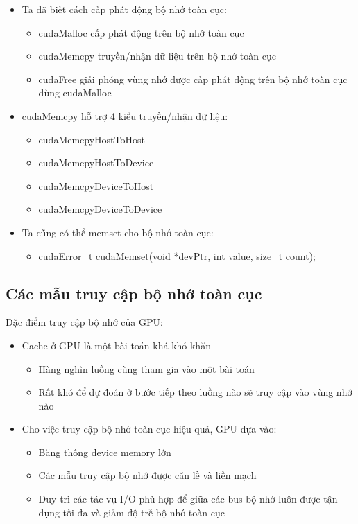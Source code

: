 \documentclass[14pt, a4paper]{article}
\numberwithin{equation}{section}
\numberwithin{figure}{section}
\numberwithin{dl}{section}
\numberwithin{md}{section}
\numberwithin{bd}{section}
\numberwithin{dn}{section}
\numberwithin{hq}{section}
\begin{document}
\begin{itemize}
    \item Ta đã biết cách cấp phát động bộ nhớ toàn cục:
    \begin{itemize}
        \item cudaMalloc cấp phát động trên bộ nhớ toàn cục
        \item cudaMemcpy truyền/nhận dữ liệu trên bộ nhớ toàn cục 
        \item cudaFree giải phóng vùng nhớ được cấp phát động trên bộ nhớ toàn cục dùng cudaMalloc
    \end{itemize}
    \item cudaMemcpy hỗ trợ 4 kiểu truyền/nhận dữ liệu:
    \begin{itemize}
        \item cudaMemcpyHostToHost
        \item cudaMemcpyHostToDevice
        \item cudaMemcpyDeviceToHost
        \item cudaMemcpyDeviceToDevice
    \end{itemize}
    \item Ta cũng có thể memset cho bộ nhớ toàn cục:
    \begin{itemize}
        \item cudaError\_t cudaMemset(void *devPtr, int value, size\_t count);
        
    \end{itemize}
\end{itemize}

\subsection{Các mẫu truy cập bộ nhớ toàn cục}

Đặc điểm truy cập bộ nhớ của GPU:

\begin{itemize}
    \item Cache ở GPU là một bài toán khá khó khăn
    \begin{itemize}
        \item Hàng nghìn luồng cùng tham gia vào một bài toán
        \item Rất khó để dự đoán ở bước tiếp theo luồng nào sẽ truy cập vào vùng nhớ nào 
    \end{itemize}
\end{itemize}

\begin{itemize}
    \item Cho việc truy cập bộ nhớ toàn cục hiệu quả, GPU dựa vào:
    \begin{itemize}
        \item Băng thông device memory lớn
        \item Các mẫu truy cập bộ nhớ được căn lề và liền mạch
        \item Duy trì các tác vụ I/O phù hợp để giữa các bus bộ nhớ luôn được tận dụng tối đa và giảm độ trễ bộ nhớ toàn cục
    \end{itemize}
\end{itemize}
\end{document}
